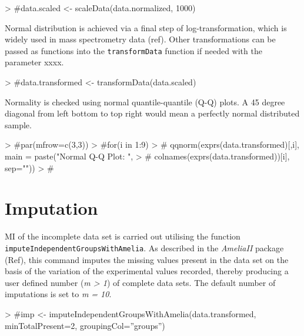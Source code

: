 \documentclass[a4paper,11pt]{article}
\newcommand{\Rfunction}[1]{{\texttt{#1}}}
\newcommand{\Rpackage}[1]{\textit{#1}}
\begin{document}
\begin{Schunk}
\begin{Sinput}
> #data.scaled <- scaleData(data.normalized, 1000)
\end{Sinput}
\end{Schunk}

Normal distribution is achieved via a final step of log-transformation, which is widely used in mass spectrometry data (ref). Other transformations can be passed as functions into the \Rfunction{transformData} function if needed with the parameter xxxx.

\begin{Schunk}
\begin{Sinput}
> #data.transformed <- transformData(data.scaled)
\end{Sinput}
\end{Schunk}

Normality is checked using normal quantile-quantile (Q-Q) plots. A 45 degree diagonal from left bottom to top 
right would mean a perfectly normal distributed sample.

\begin{Schunk}
\begin{Sinput}
> #par(mfrow=c(3,3))
> #for(i in 1:9) {
> #  qqnorm(exprs(data.transformed)[,i], main = paste("Normal Q-Q Plot: ", 
> #  colnames(exprs(data.transformed))[i], sep=""))
> #}
\end{Sinput}
\end{Schunk}


\section{Imputation}

MI of the incomplete data set is carried out utilising the function \Rfunction{imputeIndependentGroupsWithAmelia}. As 
described in the \Rpackage{AmeliaII} package (Ref), this command imputes the missing values present in the data set on the basis of the variation of the experimental values recorded, thereby producing a user defined number (\emph{m > 1}) of 
complete data sets. The default number of imputations is set to \emph{m = 10}. 

\begin{Schunk}
\begin{Sinput}
> #imp <- imputeIndependentGroupsWithAmelia(data.transformed, minTotalPresent=2, groupingCol=”groups”)
\end{Sinput}
\end{Schunk}
\end{document}
